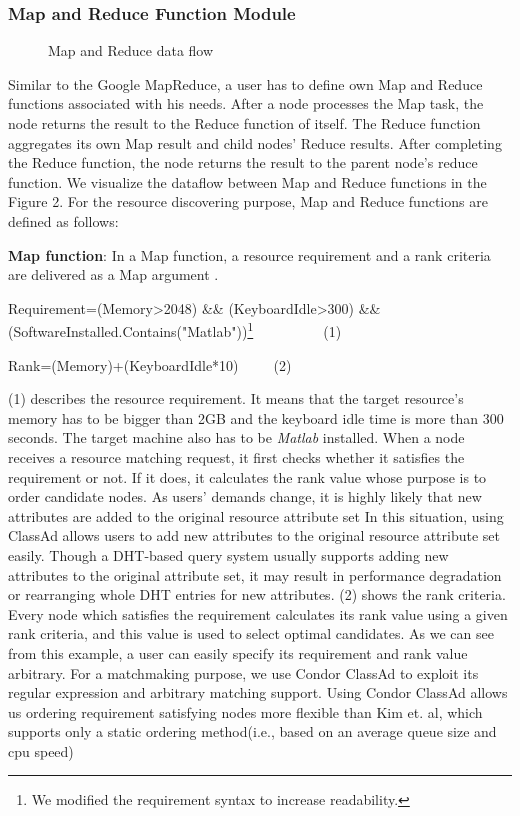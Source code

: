 \documentclass{acm_proc_article-sp}
\begin{document}
\subsubsection{Map and Reduce Function Module}
\begin{figure}
\centering
{}
\caption{Map and Reduce data flow}
\end{figure}
Similar to the Google MapReduce, a user has to define own Map and Reduce functions associated with his needs. 
After a node processes the Map task, the node returns the result to the Reduce function of itself.
The Reduce function aggregates its own Map result and child nodes' Reduce results. 
After completing the Reduce function, the node returns the result to the parent node's reduce function.
We visualize the dataflow between Map and Reduce functions in the Figure 2.
For the resource discovering purpose, Map and Reduce functions are defined as follows:

\textbf{Map function}: In a Map function, a resource requirement and a rank criteria are delivered as a Map argument .
\begin{flushleft}Requirement=(Memory>2048) \&\& (KeyboardIdle>300) \&\& (SoftwareInstalled.Contains("Matlab"))\footnote{We modified the requirement syntax to increase readability.}\ \ \ \ \ \ \ \ \ \ (1)\end{flushleft}
\begin{flushleft}Rank=(Memory)+(KeyboardIdle*10)\ \ \ \ \ (2)\end{flushleft}
(1) describes the resource requirement. It means that the target resource's memory has to be bigger than 2GB and the keyboard idle time is more than 300 seconds.
The target machine also has to be \textit{Matlab} installed.
When a node receives a resource matching request, it first checks whether it satisfies the requirement or not. If it does, it calculates the rank value whose purpose is to order candidate nodes.
As users' demands change, it is highly likely that new attributes are added to the original resource attribute set 
In this situation, using ClassAd allows users to add new attributes to the original resource attribute set easily.
Though a DHT-based query system usually supports adding new attributes to the original attribute set, it may result in performance degradation or rearranging whole DHT entries for new attributes.
(2) shows the rank criteria. Every node which satisfies the requirement calculates its rank value using a given rank criteria, and this value is used to select optimal candidates.
As we can see from this example, a user can easily specify its requirement and rank value arbitrary.
For a matchmaking purpose, we use Condor ClassAd\cite{classad} to exploit its regular expression and arbitrary matching support.
Using Condor ClassAd allows us ordering requirement satisfying nodes more flexible than Kim et. al\cite{can_query}, which supports only a static ordering method(i.e., based on an average queue size and cpu speed)
\end{document}
